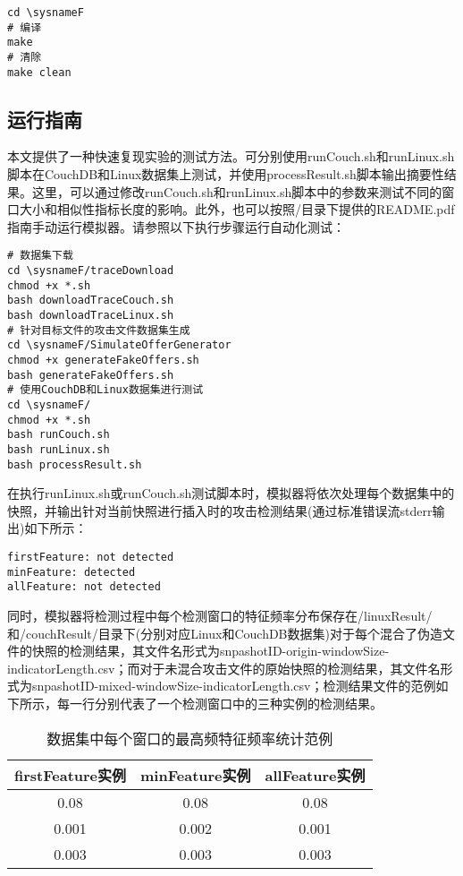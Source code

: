 \begin{lstlisting}[style=shell]
cd \sysnameF
# 编译
make
# 清除
make clean
\end{lstlisting}

\subsection*{运行指南}
本文提供了一种快速复现实验的测试方法。可分别使用runCouch.sh和runLinux.sh脚本在CouchDB和Linux数据集上测试\sysnameF，并使用processResult.sh脚本输出摘要性结果。这里，可以通过修改runCouch.sh和runLinux.sh脚本中的参数来测试不同的窗口大小和相似性指标长度的影响。此外，也可以按照\sysnameF/目录下提供的README.pdf指南手动运行模拟器。请参照以下执行步骤运行自动化测试：

\begin{lstlisting}[style=shell]
# 数据集下载
cd \sysnameF/traceDownload
chmod +x *.sh
bash downloadTraceCouch.sh
bash downloadTraceLinux.sh
# 针对目标文件的攻击文件数据集生成
cd \sysnameF/SimulateOfferGenerator
chmod +x generateFakeOffers.sh
bash generateFakeOffers.sh
# 使用CouchDB和Linux数据集进行测试
cd \sysnameF/
chmod +x *.sh
bash runCouch.sh
bash runLinux.sh
bash processResult.sh
\end{lstlisting}

在执行runLinux.sh或runCouch.sh测试脚本时，模拟器将依次处理每个数据集中的快照，并输出针对当前快照进行插入时的攻击检测结果(通过标准错误流stderr输出)如下所示：

\begin{lstlisting}[style=shell]
firstFeature: not detected
minFeature: detected
allFeature: not detected
\end{lstlisting}

同时，模拟器将检测过程中每个检测窗口的特征频率分布保存在\sysnameF/linuxResult/和\sysnameF/couchResult/目录下(分别对应Linux和CouchDB数据集)对于每个混合了伪造文件的快照的检测结果，其文件名形式为{snpashotID}-origin-{windowSize}-{indicatorLength}.csv；而对于未混合攻击文件的原始快照的检测结果，其文件名形式为{snpashotID}-mixed-{windowSize}-{indicatorLength}.csv；检测结果文件的范例如下所示，每一行分别代表了一个检测窗口中\sysnameF 的三种实例的检测结果。

\begin{table}[!htb]
  \small
  \centering
  \caption{数据集中每个窗口的最高频特征频率统计范例}
  \label{tab:system-detection-window}
  \begin{tabular}{ccc}
    \toprule
    firstFeature实例 & minFeature实例 & allFeature实例 \\
    \midrule
    0.08             & 0.08           & 0.08           \\
    0.001            & 0.002          & 0.001          \\
    0.003            & 0.003          & 0.003          \\
    \bottomrule
  \end{tabular}
\end{table}

